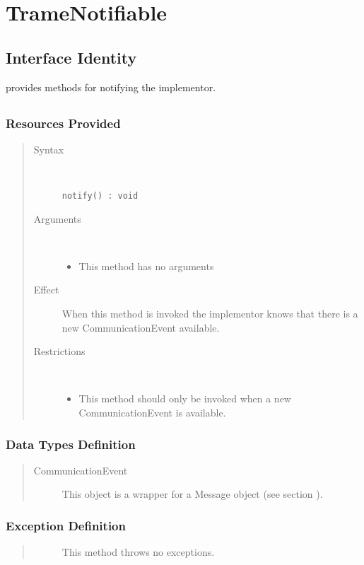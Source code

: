 \section{TrameNotifiable}
\label{api:rm-trame-notifiable}

\subsection{Interface Identity}

\npar {} provides methods for notifying the
implementor.

\subsection{}

\subsubsection{Resources Provided}

\begin{quote}
	\begin{description}
		\item[Syntax] \
		\begin{verbatim}
notify() : void
		\end{verbatim}
		\item[Arguments] \
		\begin{itemize}
		  \item This method has no arguments
		\end{itemize}
		\item[Effect] When this method is invoked the implementor knows that there is
		a new CommunicationEvent available.
		\item[Restrictions] \
		\begin{itemize}
		  \item This method should only be invoked when a new CommunicationEvent is
		  available.
		\end{itemize}
	\end{description} 
\end{quote}

\subsubsection{Data Types Definition}

\begin{quote}
	\begin{description}
		\item[CommunicationEvent] This object is a wrapper for a Message object (see
		section \label{api:rm-translator-api}).
	\end{description} 
\end{quote}

\subsubsection{Exception Definition} 

\begin{quote}
	\begin{description}
		\item[] This method throws no exceptions.
	\end{description} 
\end{quote}